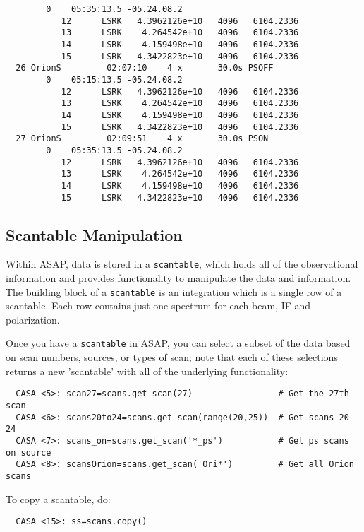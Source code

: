 \begin{verbatim}
        0    05:35:13.5 -05.24.08.2
           12      LSRK   4.3962126e+10   4096   6104.2336
           13      LSRK    4.264542e+10   4096   6104.2336
           14      LSRK    4.159498e+10   4096   6104.2336
           15      LSRK   4.3422823e+10   4096   6104.2336
  26 OrionS         02:07:10    4 x       30.0s PSOFF
        0    05:15:13.5 -05.24.08.2
           12      LSRK   4.3962126e+10   4096   6104.2336
           13      LSRK    4.264542e+10   4096   6104.2336
           14      LSRK    4.159498e+10   4096   6104.2336
           15      LSRK   4.3422823e+10   4096   6104.2336
  27 OrionS         02:09:51    4 x       30.0s PSON
        0    05:35:13.5 -05.24.08.2
           12      LSRK   4.3962126e+10   4096   6104.2336
           13      LSRK    4.264542e+10   4096   6104.2336
           14      LSRK    4.159498e+10   4096   6104.2336
           15      LSRK   4.3422823e+10   4096   6104.2336
\end{verbatim}
\normalsize


\subsection{Scantable Manipulation}
\label{subsection:sd.asap.scantable}

Within ASAP, data is stored in a {\tt scantable}, which holds all of the
observational information and provides functionality to manipulate the
data and information. The building block of a {\tt scantable} is an
integration which is a single row of a scantable. Each row contains
just one spectrum for each beam, IF and polarization.  

Once you have a {\tt scantable} in ASAP, you can select a subset of the
data based on scan numbers, sources, or types of scan; note that each
of these selections returns a new 'scantable' with all of the 
underlying functionality: 

\small
\begin{verbatim}
  CASA <5>: scan27=scans.get_scan(27)                 # Get the 27th scan
  CASA <6>: scans20to24=scans.get_scan(range(20,25))  # Get scans 20 - 24
  CASA <7>: scans_on=scans.get_scan('*_ps')           # Get ps scans on source
  CASA <8>: scansOrion=scans.get_scan('Ori*')         # Get all Orion scans
\end{verbatim}
\normalsize

To copy a scantable, do:

\small
\begin{verbatim}
  CASA <15>: ss=scans.copy()
\end{verbatim}
\normalsize

